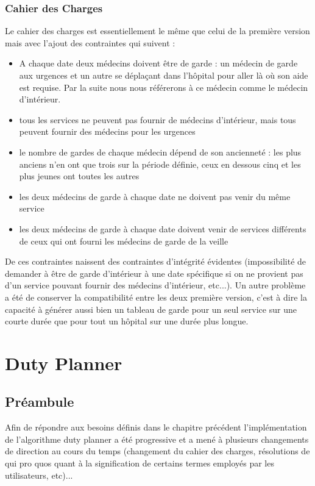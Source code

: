 \documentclass[11pt]{report}
\begin{document}
\subsection{Cahier des Charges}
Le cahier des charges est essentiellement le même que celui de la première version mais avec l'ajout des contraintes qui suivent : 
\begin{itemize}
\item A chaque date deux médecins doivent être de garde : un médecin de garde aux urgences et un autre se déplaçant dans l'hôpital pour aller là où son aide est requise.
Par la suite nous nous référerons à ce médecin comme le médecin d'intérieur.
\item tous les services ne peuvent pas fournir de médecins d'intérieur, mais tous peuvent fournir des médecins pour les urgences
\item le nombre de gardes de chaque médecin dépend de son ancienneté : les plus anciens n'en ont que trois sur la période définie, ceux en dessous cinq et les plus jeunes ont toutes les autres
\item les deux médecins de garde à chaque date ne doivent pas venir du même service
\item les deux médecins de garde à chaque date doivent venir de services différents de ceux qui ont fourni les médecins de garde de la veille
\end{itemize}

De ces contraintes naissent des contraintes d'intégrité évidentes (impossibilité de demander à être de garde d'intérieur à une date spécifique si on ne provient pas d'un service pouvant fournir des médecins d'intérieur, etc...).
Un autre problème a été de conserver la compatibilité entre les deux première version, c'est à dire la capacité à générer aussi bien un tableau de garde pour un seul service sur une courte durée que pour tout un hôpital sur une durée plus longue.

\chapter{Duty Planner}
\section{Préambule}
	Afin de répondre aux besoins définis dans le chapitre précédent l'implémentation de l'algorithme duty planner a été progressive et a mené à plusieurs changements de direction au cours du temps (changement du cahier des charges, résolutions de qui pro quos quant à la signification de certains termes employés par les utilisateurs, etc)...
\end{document}
